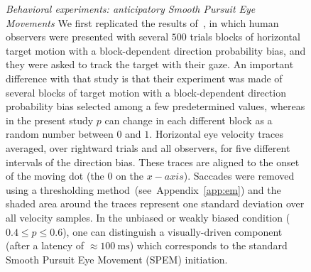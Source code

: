 \documentclass[12pt,english]{article}%
\newcommand{\ms}{\si{\milli\second}}%
\newcommand{\citet}[1]{\textcite{#1}}
\newcommand{\seeFig}[1]{Figure~\ref{fig:#1}}
\newcommand{\seeApp}[1]{Appendix~\ref{app:#1}}
\begin{document}
\begin{figure}%
\caption{
\emph{Behavioral experiments: anticipatory Smooth Pursuit Eye Movements}
We first replicated the results of~\citet{Montagnini2010},
in which human observers were presented with several $500$ trials blocks of horizontal target motion with a block-dependent direction probability bias, and they were asked to track the target with their gaze.
An important difference with that study is that their experiment was made of several blocks of target motion with a block-dependent direction probability bias selected among a few predetermined values, whereas in the present study $p$ can change in each different block as a random number between $0$ and $1$.
Horizontal eye velocity traces 
averaged, over rightward trials and all observers, for five different intervals of the direction bias.
These traces are aligned to the onset of the moving dot (the $0$ on the $x-axis$).
Saccades were removed using a thresholding method~(see~\seeApp{em}) and
the shaded area around the traces represent one standard deviation over all velocity samples.
In the unbiased or weakly biased condition ($0.4\leq p\leq 0.6 $), one can distinguish
a visually-driven component (after a latency of $\approx 100~\ms$)
which corresponds to the standard Smooth Pursuit Eye Movement (SPEM) initiation.
}
\end{figure}
\end{document}
